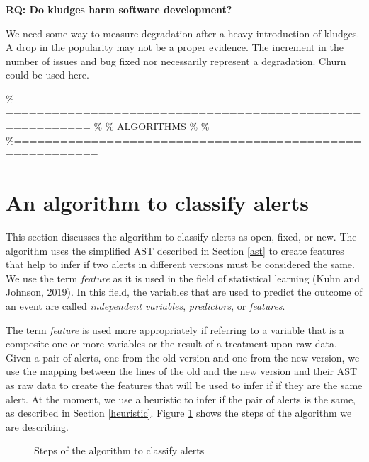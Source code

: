 \documentclass[
]{article}
\begin{document}
\vspace{16px}

\noindent \textbf{RQ: Do kludges harm software development?}
\label{kludge_harm}

We need some way to measure degradation after a heavy introduction of
kludges. A drop in the popularity may not be a proper evidence. The
increment in the number of issues and bug fixed nor necessarily
represent a degradation. Churn could be used here.

\% ========================================================= \% \%
ALGORITHMS \% \%
\%=========================================================

\section{An algorithm to classify alerts}
\label{alg}

This section discusses the algorithm to classify alerts as open, fixed,
or new. The algorithm uses the simplified AST described in Section
\ref{ast} to create features that help to infer if two alerts in
different versions must be considered the same. We use the term
\textit{feature} as it is used in the field of statistical learning
(Kuhn and Johnson, 2019). In this field, the variables that are used to
predict the outcome of an event are called \emph{independent variables},
\emph{predictors}, or \emph{features}.

The term \emph{feature} is used more appropriately if referring to a
variable that is a composite one or more variables or the result of a
treatment upon raw data. Given a pair of alerts, one from the old
version and one from the new version, we use the mapping between the
lines of the old and the new version and their AST as raw data to create
the features that will be used to infer if if they are the same alert.
At the moment, we use a heuristic to infer if the pair of alerts is the
same, as described in Section \ref{heuristic}. Figure \ref{fig:diag}
shows the steps of the algorithm we are describing.

\begin{figure}
  \centering
  \caption{Steps of the algorithm to classify alerts}\label{fig:diag}
\end{figure}
\end{document}
